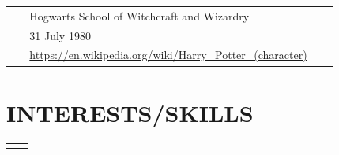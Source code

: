 \documentclass[10pt]{article} %
\begin{document}
\begin{paracol}{2}
\parbox[top][0.12\textheight][c]{\linewidth}{ %
	\vspace{-0.04\textheight} %
	\colorbox{shade}{ %
		\begin{supertabular}{p{0.05\linewidth}|p{0.775\linewidth}} %
			\raisebox{-1pt}{\faUniversity} & Hogwarts School of Witchcraft and Wizardry \\
			\raisebox{-1pt}{\faBirthdayCake} & 31 July 1980 \\ %
			\raisebox{-1pt}{\faHome} & \href{https://en.wikipedia.org/wiki/Harry\_Potter\_(character)}{https://en.wikipedia.org/wiki/Harry\_Potter\_(character)} \\ %
		\end{supertabular}
	}
}


\section{INTERESTS/SKILLS} 





\begin{supertabular}{rl} %
	
	

\end{supertabular}
\end{paracol}
\end{document}
